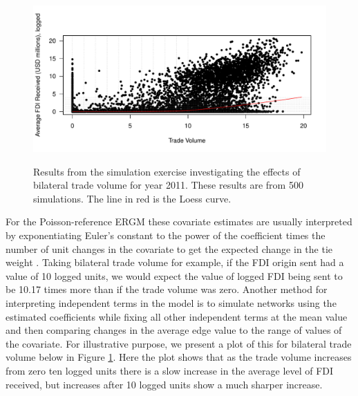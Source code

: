 \documentclass[reqno,onecolumn,letterpaper,12pt]{article}
\begin{document}
\begin{figure}[!h]
\centering
\includegraphics[scale=.75]{./figures/tradevol_sims} \vspace{-.5cm}\\
\caption{\label{fig:tradevol} Results from the simulation exercise investigating the effects of bilateral trade volume  for year 2011. These results are from 500 simulations. The line in red is the Loess curve.}
\end{figure}

For the Poisson-reference ERGM these covariate estimates are usually interpreted by exponentiating Euler's constant to the power of the coefficient times the number of unit changes in the covariate to get the expected change in the tie weight \citep{krivitsky2013modeling}. Taking bilateral trade volume for example, if the FDI origin sent had a value of 10 logged units, we would expect the value of logged FDI being sent to be 10.17 times more than if the trade volume was zero. Another method for interpreting independent terms in the model is to simulate networks using the estimated coefficients while fixing all other independent terms at the mean value and then comparing changes in the average edge value to the range of values of the covariate. For illustrative purpose, we present a plot of this for bilateral trade volume below in Figure \ref{fig:tradevol}. Here the plot shows that as the trade volume increases from zero ten logged units there is a slow increase in the average level of FDI received, but increases after 10 logged units show a much sharper increase.
\end{document}
